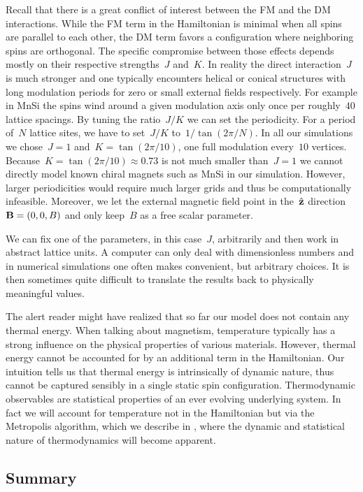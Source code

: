 Recall that there is a great conflict of interest between the FM and the DM
interactions. While the FM term in the Hamiltonian is minimal when all spins are
parallel to each other, the DM term favors a configuration where neighboring
spins are orthogonal. The specific compromise between those effects depends
mostly on their respective strengths~$J$ and~$K$. In reality the direct
interaction~$J$ is much stronger and one typically encounters helical or conical
structures with long modulation periods for zero or small external fields
respectively. For example in MnSi the spins wind around a given modulation axis
only once per roughly~$40$ lattice spacings. By tuning the ratio~$J/K$ we can
set the periodicity. For a period of~$N$ lattice sites, we have to set~$J/K$
to~$1/\tan(2\pi / N)$. In all our simulations we chose~$J=1$ and~$K=\tan(2\pi /
10)$, \ie{} one full modulation every~$10$ vertices. Because~$K=\tan(2\pi /
10)\approx 0.73$ is not much smaller than~$J=1$ we cannot directly model known
chiral magnets such as MnSi in our simulation. However, larger periodicities
would require much larger grids and thus be computationally infeasible.
Moreover, we let the external magnetic field point in the~$\hat{\mathbf{z}}$
direction~$\mathbf{B}=(0,0,B)$ and only keep~$B$ as a free scalar parameter.

We can fix one of the parameters, in this case~$J$, arbitrarily and then work in
abstract lattice units. A computer can only deal with dimensionless numbers and
in numerical simulations one often makes convenient, but arbitrary choices.
It is then sometimes quite difficult to translate the results back to physically
meaningful values.

The alert reader might have realized that so far our model does not contain any
thermal energy. When talking about magnetism, temperature typically has a strong
influence on the physical properties of various materials. However, thermal
energy cannot be accounted for by an additional term in the Hamiltonian. Our
intuition tells us that thermal energy is intrinsically of dynamic nature, thus
cannot be captured sensibly in a single static spin configuration. Thermodynamic
observables are statistical properties of an ever evolving underlying system. In
fact we will account for temperature not in the Hamiltonian but via the
Metropolis algorithm, which we describe in , where the
dynamic and statistical nature of thermodynamics will become apparent.

\subsection{Summary}

